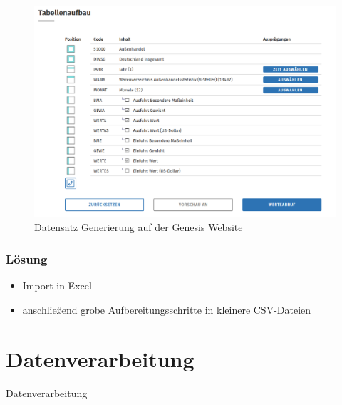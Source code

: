 \documentclass{beamer}
\begin{document}
\begin{frame}
	\frametitle{}
	\begin{figure}[h]
		\caption{Datensatz Generierung auf der Genesis Website}
		\centering
		\includegraphics[scale=0.25]{9_Tabellanaufbau}
	\end{figure}
\end{frame}

\begin{frame}
	\frametitle{Lösung}
	\begin{itemize}
		\item Import in Excel
		\item anschließend grobe Aufbereitungsschritte in kleinere CSV-Dateien
	\end{itemize}
\end{frame}

\section{Datenverarbeitung}
\begin{frame}
	\begin{center}
		{\Huge Datenverarbeitung}
	\end{center}
\end{frame}
\end{document}
